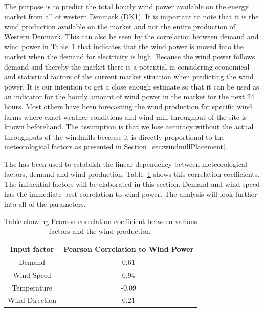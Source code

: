The purpose is to predict the total hourly wind power available on the energy market from all of western Denmark (DK1). It is important to note that it is the wind production available on the market and not the entire production of Western Denmark. This can also be seen by the correlation between demand and wind power in Table~\ref{table:pearsonCoeficientWindProduction} that indicates that the wind power is moved into the market when the demand for electricity is high. Because the wind power follows demand and thereby the market there is a potential in considering  economical and statistical factors of the current market situation when predicting the wind power. It is our intention to get a close enough estimate so that it can be used as an indicator for the hourly amount of wind power in the market for the next 24 hours.
Most others have been forecasting the wind production for specific wind farms where exact weather conditions and wind mill throughput of the site is known beforehand. The assumption is that we lose accuracy without the actual throughputs of the windmills because it is directly proportional to the meteorological factors as presented in Section~\ref{sec:windmillPlacement}. 

The  has been used to establish the linear dependency between meteorological factors, demand and wind production. Table~\ref{table:pearsonCoeficientWindProduction} shows this correlation coefficients. The influential factors will be elaborated in this section. Demand and wind speed has the immediate best correlation to wind power. The analysis will look further into all of the parameters.

\begin{table}[H]
\centering  %
\begin{tabular}{|c|c|} %
\hline
Input factor & Pearson Correlation to Wind Power \\ 
\hline                  %
Demand & 0.61 \\ \hline %
Wind Speed & 0.94 \\ \hline
Temperature & -0.09 \\ \hline
Wind Direction & 0.21 \\
\hline %
\end{tabular}
\caption{Table showing Pearson correlation coefficient between various factors and the wind production.} %
\label{table:pearsonCoeficientWindProduction} %
\end{table}


